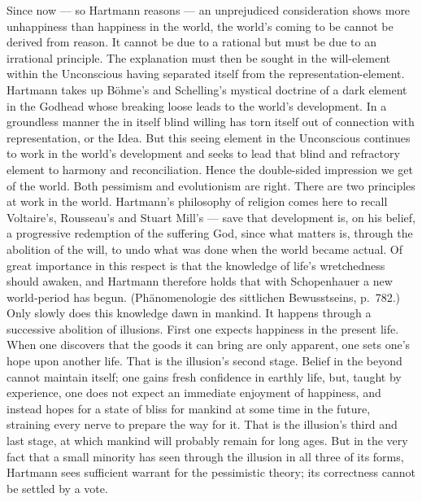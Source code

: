 \documentclass[12pt,a4paper]{book}
\newcommand{\opage}[1]{\marginnote{\footnotesize\textit{[#1]}}}
\begin{document}
Since now --- so Hartmann reasons --- an unprejudiced consideration shows more
unhappiness than happiness in the world, the world's coming to be cannot be
derived from reason. It cannot be due to a rational but must be due to an
irrational principle. The explanation must then be sought in the will-element
within the Unconscious having separated itself from the representation-element.
Hartmann takes up Böhme's and Schelling's mystical doctrine of a dark element in
the Godhead whose breaking loose leads to the world's development. In a
groundless manner the in itself blind willing has torn itself out of connection
with representation, or the Idea. But this seeing element in the Unconscious
continues to work in the world's development and seeks to lead that blind and
refractory element to harmony and reconciliation. Hence the double-sided
impression we get of the world. Both pessimism and evolutionism are right. There
are two principles at work in the world. Hartmann's philosophy of religion comes
here to recall Voltaire's, Rousseau's and Stuart Mill's --- save that development
is, on his belief, a progressive redemption of the suffering God, since what
matters is, through the abolition of the will, to undo what was done when the
world became actual. Of great importance in this respect is that the knowledge of
life's wretchedness should awaken, and Hartmann therefore holds that with
Schopenhauer a new world-period has begun. (Phänomenologie des sittlichen
Bewusstseins, p.~782.) Only slowly does this knowledge dawn in mankind. It
happens through a successive \opage{542}abolition of illusions. First one expects happiness
in the present life. When one discovers that the goods it can bring are only
apparent, one sets one's hope upon another life. That is the illusion's second
stage. Belief in the beyond cannot maintain itself; one gains fresh confidence in
earthly life, but, taught by experience, one does not expect an immediate
enjoyment of happiness, and instead hopes for a state of bliss for mankind at
some time in the future, straining every nerve to prepare the way for it. That is
the illusion's third and last stage, at which mankind will probably remain for
long ages. But in the very fact that a small minority has seen through the
illusion in all three of its forms, Hartmann sees sufficient warrant for the
pessimistic theory; its correctness cannot be settled by a vote.
\end{document}
